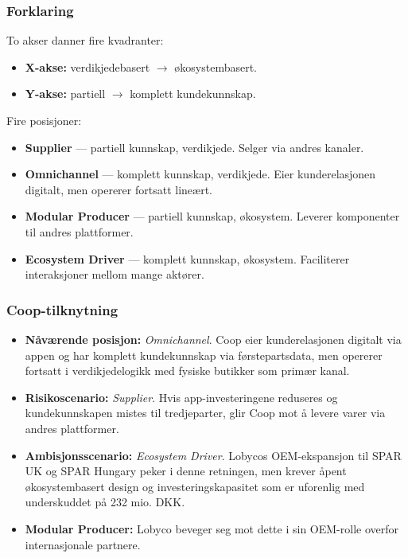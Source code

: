 \subsubsection*{Forklaring}
To akser danner fire kvadranter:
\begin{itemize}
  \item \textbf{X-akse:} verdikjedebasert $\to$ økosystembasert.
  \item \textbf{Y-akse:} partiell $\to$ komplett kundekunnskap.
\end{itemize}
Fire posisjoner:
\begin{itemize}
  \item \textbf{Supplier} --- partiell kunnskap, verdikjede. Selger via
    andres kanaler.
  \item \textbf{Omnichannel} --- komplett kunnskap, verdikjede. Eier
    kunderelasjonen digitalt, men opererer fortsatt lineært.
  \item \textbf{Modular Producer} --- partiell kunnskap, økosystem.
    Leverer komponenter til andres plattformer.
  \item \textbf{Ecosystem Driver} --- komplett kunnskap, økosystem.
    Faciliterer interaksjoner mellom mange aktører.
\end{itemize}

\subsubsection*{Coop-tilknytning}
\begin{itemize}
  \item \textbf{Nåværende posisjon:} \emph{Omnichannel}. Coop eier
    kunderelasjonen digitalt via appen og har komplett kundekunnskap via
    førstepartsdata, men opererer fortsatt i verdikjedelogikk med
    fysiske butikker som primær kanal.
  \item \textbf{Risikoscenario:} \emph{Supplier}. Hvis app-investeringene
    reduseres og kundekunnskapen mistes til tredjeparter, glir Coop mot
    å levere varer via andres plattformer.
  \item \textbf{Ambisjonsscenario:} \emph{Ecosystem Driver}. Lobycos
    OEM-ekspansjon til SPAR UK og SPAR Hungary peker i denne retningen,
    men krever åpent økosystembasert design og investeringskapasitet
    som er uforenlig med underskuddet på 232 mio. DKK.
  \item \textbf{Modular Producer:} Lobyco beveger seg mot dette i sin
    OEM-rolle overfor internasjonale partnere.
\end{itemize}

